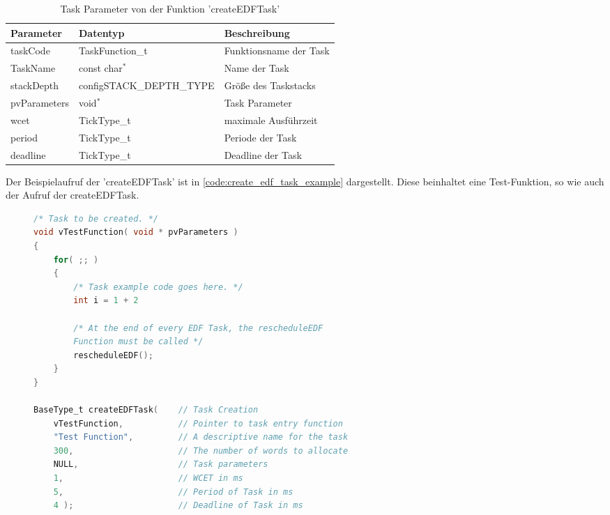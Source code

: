 \documentclass[../EDF Master Thesis.tex]{subfiles}
\begin{document}
    \begin{table}[H]
        \centering
        \begin{tabular}{l|l|l}
            Parameter & Datentyp & Beschreibung \\
            \hline
            taskCode & TaskFunction\_t & Funktionsname der Task \\
            TaskName & const char\( ^* \) & Name der Task  \\
            stackDepth & configSTACK\_DEPTH\_TYPE & Größe des Taskstacks \\
            pvParameters & void\( ^* \) & Task Parameter \\
            wcet & TickType\_t & maximale Ausführzeit \\ 
            period & TickType\_t & Periode der Task \\
            deadline & TickType\_t & Deadline der Task \\
        \end{tabular}
        \caption{Task Parameter von der Funktion 'createEDFTask'}
        \label{table:task_parameter_von_der_funktion_createEDFTask}
    \end{table}

    Der Beispielaufruf der 'createEDFTask' ist in \autoref{code:create_edf_task_example} dargestellt.
    Diese beinhaltet eine Test-Funktion, so wie auch der Aufruf der createEDFTask.

\begin{figure}[ht!]
\begin{lstlisting}[language=C, caption=createEDFTask Beispiel, label=code:create_edf_task_example]
/* Task to be created. */
void vTestFunction( void * pvParameters )
{
    for( ;; )
    {
        /* Task example code goes here. */
        int i = 1 + 2

        /* At the end of every EDF Task, the rescheduleEDF
        Function must be called */
        rescheduleEDF();
    }
}

BaseType_t createEDFTask(    // Task Creation
    vTestFunction,           // Pointer to task entry function
    "Test Function",         // A descriptive name for the task
    300,                     // The number of words to allocate
    NULL,                    // Task parameters 
    1,                       // WCET in ms
    5,                       // Period of Task in ms
    4 );                     // Deadline of Task in ms
\end{lstlisting}
\end{figure}
\end{document}
